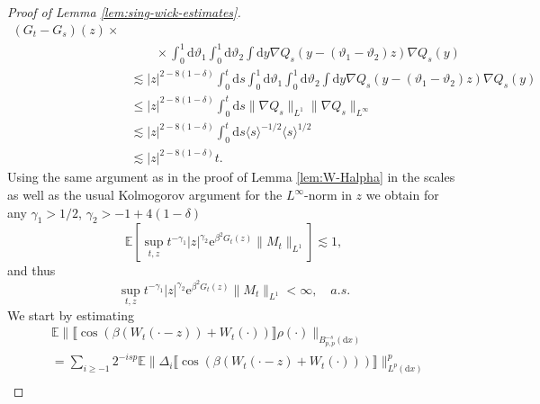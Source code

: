 \documentclass[11pt, a4paper]{scrartcl}
\numberwithin{equation}{section}
\theoremstyle{plain}
\theoremstyle{remark}
\newcommand{\mathd}{\mathrm{d}}
\newcommand{\mathe}{\mathrm{e}}
\newcommand{\tmtextbf}[1]{\text{{\bfseries{#1}}}}
\begin{document}
\begin{proof}[Proof of Lemma \ref{lem:sing-wick-estimates}]
\[\begin{aligned}
{			(G_t - G_s) (z)} \times                                                                                                \\
			                                                  & \qquad \times \int_0^1 \mathd \vartheta_1 \int_0^1 \mathd
			\vartheta_2 \int \mathd y \nabla Q_s (y - (\vartheta_1 - \vartheta_2)
			z) \nabla Q_s (y)                                                                                                      \\
			                                                  & \lesssim  | z |^{2 - 8 (1 - \delta)} \int_0^t \mathd s \int_0^1
			\mathd \vartheta_1 \int_0^1 \mathd \vartheta_2 \int \mathd y \nabla Q_s
			(y - (\vartheta_1 - \vartheta_2) z) \nabla Q_s (y)                                                                     \\
			                                                  & \leqslant  | z |^{2 - 8 (1 - \delta)}  \int_0^t \mathd s \| \nabla
			Q_s \|_{L^1} \| \nabla Q_s \|_{L^{\infty}}                                                                             \\
			                                                  & \lesssim  | z |^{2 - 8 (1 - \delta)}  \int_0^t \mathd s \langle s
			\rangle^{- 1 / 2} \langle s \rangle^{1 / 2}                                                                            \\
			                                                  & \lesssim  | z |^{2 - 8 (1 - \delta)} t.
		\end{aligned} \]
	Using the same argument as in the proof of Lemma \ref{lem:W-Halpha} in the
	scales as well as the usual Kolmogorov argument for the $L^{\infty}$-norm in
	$z$ we obtain for any $\gamma_1 > 1 / 2$, $\gamma_2 > - 1 + 4 (1 - \delta)$
	\[ \mathbb{E} [\sup_{t, z} t^{- \gamma_1} | z |^{\gamma_2} \mathe^{\beta^2
				G_t (z)} \| M_t \|_{L^1} ] \lesssim 1, \]
	and thus
	\[ \sup_{t, z} t^{- \gamma_1} | z |^{\gamma_2} \mathe^{\beta^2 G_t (z)} \|
		M_t \|_{L^1}  < \infty, \quad a.s. \]
	\tmtextbf{(C)} We start by estimating
	\[ \begin{aligned}
			 & \mathbb{E} \| \llbracket \cos (\beta (W_t (\cdot - z)) + W_t
			(\cdot)) \rrbracket \rho (\cdot) \|_{B^{- s}_{p, p} (\mathd x)}    \\
			 & = \sum_{i \geqslant - 1} 2^{- isp} \mathbb{E} \| \Delta_i
			\llbracket \cos (\beta (W_t (\cdot - z) + W_t (\cdot))) \rrbracket
			\|^p_{L^p (\mathd x)}                                              \\

\end{aligned}\]
\end{proof}
\end{document}
